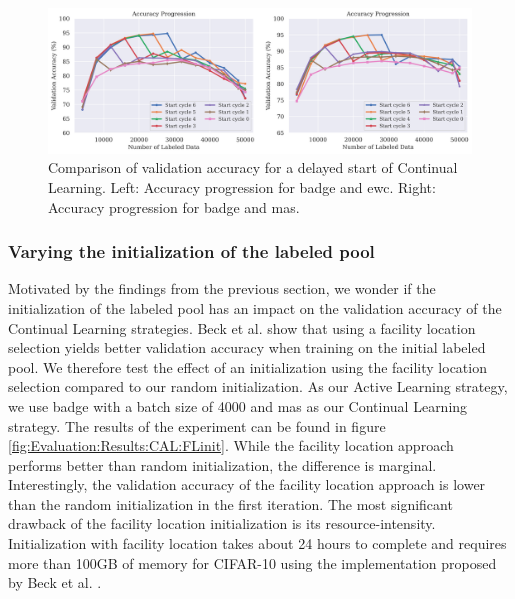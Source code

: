 \begin{figure}[h]
    \centering
    \includegraphics[width=\linewidth]{images/results_CAL/Delayed_start_CAL.png}
    \caption[Continual Active Learning Hybrid approach]{Comparison of validation accuracy for a delayed start of Continual Learning. Left: Accuracy progression for \gls{badge} and \gls{ewc}. Right: Accuracy progression for \gls{badge} and \gls{mas}.}
    \label{fig:Evaluation:Results:CAL:DelayedStart}
\end{figure}

\subsubsection{Varying the initialization of the labeled pool}
\label{sec:Evaluation:Results:CAL:Initialization}
Motivated by the findings from the previous section, we wonder if the initialization of the labeled pool has an impact on the validation accuracy of the Continual Learning strategies. Beck et al.\cite{beck2021effective} show that using a facility location selection 
\cite{iyer2021submodular} yields better validation accuracy when training on the initial labeled pool. We therefore test the effect of an initialization using the facility location selection compared to our random initialization. As our Active Learning strategy,
we use \gls{badge} with a batch size of 4000 and \gls{mas} as our Continual Learning strategy. The results of the experiment can be found in figure \ref{fig:Evaluation:Results:CAL:FLinit}. While the facility location approach performs better than random initialization, the difference is
marginal. Interestingly, the validation accuracy of the facility location approach is lower than the random initialization in the first iteration. The most significant drawback of the facility location initialization is its resource-intensity. Initialization with facility
location takes about 24 hours to complete and requires more than 100GB of memory for CIFAR-10 using the implementation proposed by Beck et al. \cite{beck2021effective}. \par

